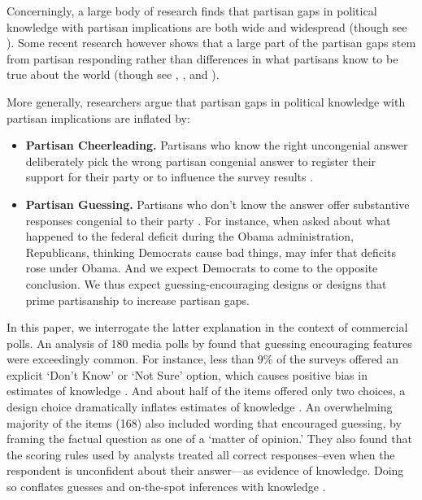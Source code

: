 \documentclass[12pt, letterpaper]{article}
\begin{document}
Concerningly, a large body of research finds that partisan gaps in political knowledge with partisan implications are both wide and widespread \citep{bartels_2002, jerit2012partisan, lodgetaber_2013} (though see \citet{roush2023}). Some recent research however shows that a large part of the partisan gaps stem from partisan responding rather than differences in what partisans know to be true about the world \citep{bullocketal_2015, prior2015you, huber_yair_2018, graham2023less} (though see \citet{peterson2021partisan}, \citet{berinsky_2017}, and \citet{malka2022expressive}). 

More generally, researchers argue that partisan gaps in political knowledge with partisan implications are inflated by: 

\begin{itemize}

    \item \textbf{Partisan Cheerleading.} Partisans who know the right uncongenial answer deliberately pick the wrong partisan congenial answer to register their support for their party or to influence the survey results \citep{prior2015you}.

    \item \textbf{Partisan Guessing.} Partisans who don't know the answer offer substantive responses congenial to their party \citep{bullocketal_2015, graham2023less}. For instance, when asked about what happened to the federal deficit during the Obama administration, Republicans, thinking Democrats cause bad things, may infer that deficits rose under Obama. And we expect Democrats to come to the opposite conclusion. We thus expect guessing-encouraging designs or designs that prime partisanship to increase partisan gaps.

\end{itemize}

In this paper, we interrogate the latter explanation in the context of commercial polls. An analysis of 180 media polls by \citet{luskinetal_nd} found that guessing encouraging features were exceedingly common. For instance, less than 9\% of the surveys offered an explicit `Don't Know' or `Not Sure' option, which causes positive bias in estimates of knowledge \citep{luskin2011don}. And about half of the items offered only two choices, a design choice dramatically inflates estimates of knowledge \citep{bullock2022response}. An overwhelming majority of the items (168) also included wording that encouraged guessing, by framing the factual question as one of a `matter of opinion.' They also found that the scoring rules used by analysts treated all correct responses--even when the respondent is unconfident about their answer---as evidence of knowledge. Doing so conflates guesses and on-the-spot inferences with knowledge \citep{pasek2015}. 
\end{document}
